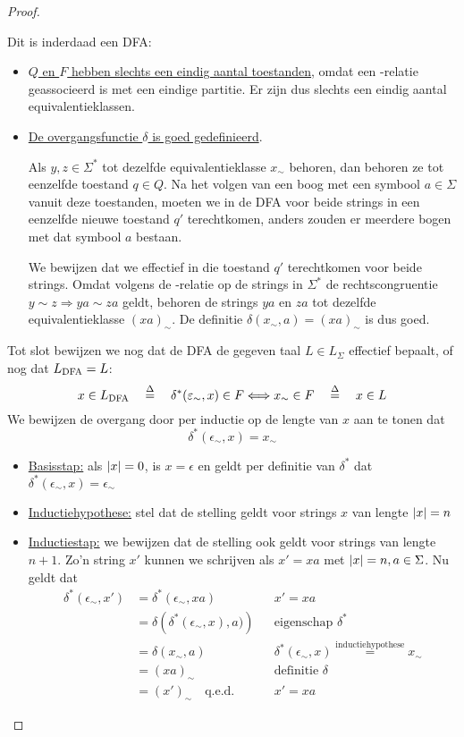 \documentclass[../aanvullingen_cursus.tex]{subfiles}
\begin{document}
\begin{proof}
\begin{itemize}
		Dit is inderdaad een DFA:
		\begin{itemize}
			\item  \underline{\(Q\) en \(F\) hebben slechts een eindig aantal toestanden}, omdat een \mnl-relatie geassocieerd is met een eindige partitie. Er zijn dus slechts een eindig aantal equivalentieklassen.
			\item \underline{De overgangsfunctie \(\delta\) is goed gedefinieerd}.

			Als \(y,z\in\Sigma^*\) tot dezelfde equivalentieklasse \(x_\sim\) behoren, dan behoren ze tot eenzelfde toestand \(q\in Q\). Na het volgen van een boog met een symbool \(a \in \Sigma\) vanuit deze toestanden, moeten we in de DFA voor beide strings in een eenzelfde nieuwe toestand \(q'\) terechtkomen, anders zouden er meerdere bogen met dat symbool \(a\) bestaan.

			We bewijzen dat we effectief in die toestand \(q'\) terechtkomen voor beide strings. Omdat volgens de \mnl-relatie op de strings in \(\Sigma^*\) de rechtscongruentie \(y \sim z \Rightarrow ya \sim za\) geldt, behoren de strings \(ya\) en \(za\) tot dezelfde equivalentieklasse \((xa)_\sim\). De definitie \(\delta(x_\sim,a)=(xa)_\sim\) is dus goed.
		\end{itemize}

		Tot slot bewijzen we nog dat de DFA de gegeven taal \(L \in L_\Sigma\) effectief bepaalt, of nog dat \(L_{\text{DFA}} = L\): \[x \in L_{\text{DFA}} \quad \overset{\Delta}{=} \quad \delta^*(\varepsilon_\sim,x)\in F \Longleftrightarrow x_\sim \in F \quad \overset{\Delta}{=} \quad x\in L \] We bewijzen de overgang door per inductie op de lengte van \(x\) aan te tonen dat \[\delta^*(\epsilon_\sim,x)=x_\sim\]
		\begin{itemize}
			\item \underline{Basisstap:} als \(\lvert x \rvert=0\), is \(x=\epsilon\) en geldt per definitie van \(\delta^*\) dat \(\delta^*(\epsilon_\sim,x)=\epsilon_\sim\)
			\item \underline{Inductiehypothese:} stel dat de stelling geldt voor strings \(x\) van lengte \(\lvert x \rvert=n\)
			\item \underline{Inductiestap:} we bewijzen dat de stelling ook geldt voor strings van lengte \(n+1\). Zo'n string \(x'\) kunnen we schrijven als \(x'=xa\) met \(\lvert x \rvert=n,a\in \Sigma\). Nu geldt dat
			\begin{align*}
				\delta^*(\epsilon_\sim,x')&=\delta^*(\epsilon_\sim,xa) && x'=xa\\
				&=\delta\left(\delta^*(\epsilon_\sim,x),a)\right) && \text{eigenschap } \delta^* \\
				&=\delta(x_\sim,a) && \delta^*(\epsilon_\sim,x) \overset{\text{inductiehypothese}}{=}x_\sim \\
				&=(xa)_\sim && \text{definitie } \delta \\
				&=(x')_\sim \quad \text{q.e.d.} && x'=xa
			\end{align*}
		\end{itemize}
	\end{itemize}
\end{proof}
\end{document}
